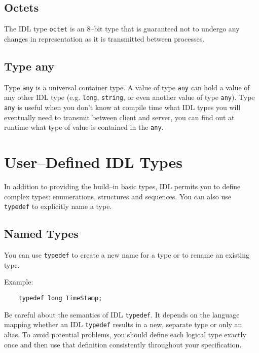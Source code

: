 \subsection{Octets}
The IDL type {\tt octet} is an 8--bit type that is guaranteed not to undergo any
changes in representation as it is transmitted between processes.

\subsection{Type any}
Type {\tt any} is a universal container type. A value of type {\tt any} can hold
a value of any other IDL type (e.g. {\tt long}, {\tt string}, or even another
value of type {\tt any}).
Type {\tt any} is useful when you don't know at compile time what IDL types you
will eventually need to transmit between client and server, you can find out at
runtime what type of value is contained in the {\tt any}.


\newpage
\section{User--Defined IDL Types}
In addition to providing the build--in basic types, IDL permits you to define
complex types: enumerations, structures and sequences. You can also use {\tt 
typedef} to explicitly name a type.

\subsection{Named Types}

You can use {\tt typedef} to create a new name for a type or to rename an
existing type.

Example:
\begin{verbatim}
    typedef long TimeStamp;
\end{verbatim}

Be careful about the semantics of IDL {\tt typedef}. It depends on the language
mapping whether an IDL {\tt typedef} results in a new, separate type or only an
alias. 
To avoid potential problems, you should define each logical type exactly once
and then use that definition consistently throughout your specification.


